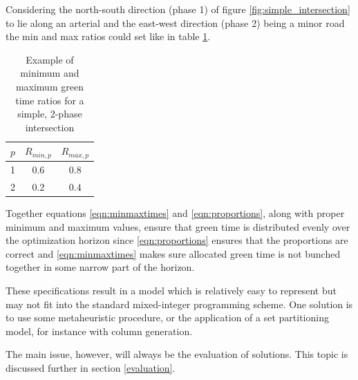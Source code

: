 Considering the north-south direction (phase 1) of figure \ref{fig:simple_intersection} to lie along an arterial and the east-west direction (phase 2) being a minor road the min and max ratios could set like in table \ref{tbl:minmaxratios}.

\begin{table}[!ht]
\begin{center}
\begin{tabular}{c|c|c}
$p$ & $R_{min,p}$ & $R_{max,p}$ \\ \hline
1 & $0.6$ & $0.8$ \\ 
2 & $0.2$ & $0.4$
\end{tabular}
\end{center}
\caption{Example of minimum and maximum green time ratios for a simple, 2-phase intersection}
\label{tbl:minmaxratios}
\end{table}

Together equations \ref{eqn:minmaxtimes} and \ref{eqn:proportions}, along with proper minimum and maximum values, ensure that green time is distributed evenly over the optimization horizon since \ref{eqn:proportions} ensures that the proportions are correct and \ref{eqn:minmaxtimes} makes sure allocated green time is not bunched together in some narrow part of the horizon.

These specifications result in a model which is relatively easy to represent but may not fit into the standard mixed-integer programming scheme. One solution is to use some metaheuristic procedure, or the application of a set partitioning model, for instance with column generation.

The main issue, however, will always be the evaluation of solutions. This topic is discussed further in section \ref{evaluation}.